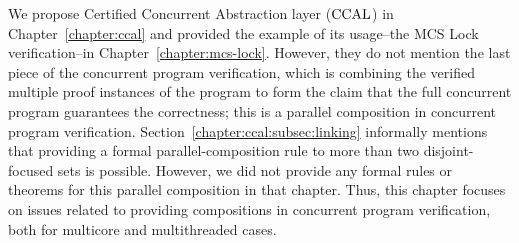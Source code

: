    

We propose Certified Concurrent Abstraction layer ($\mathrm{CCAL}$) in Chapter~\ref{chapter:ccal} and provided the example of its usage--the MCS Lock verification--in Chapter~\ref{chapter:mcs-lock}.
However, they do not mention  the last piece of the concurrent program verification, which is
combining the verified multiple proof instances of the program
to form the claim that the full concurrent program guarantees the correctness; this is
 a parallel composition in concurrent program verification.
Section~\ref{chapter:ccal:subsec:linking}
 informally mentions that providing a formal  parallel-composition rule to more than two disjoint-focused sets is possible.
However, we did not provide any formal rules or theorems for this parallel composition in that chapter.
Thus, this chapter focuses on  issues related to providing compositions in concurrent program verification,
both for multicore and multithreaded cases.

